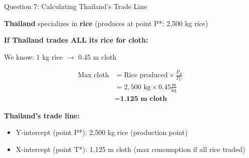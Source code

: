 \documentclass{beamer}
\begin{document}
\begin{frame}{Question 7: Calculating Thailand's Trade Line}

\textbf{Thailand} specializes in \textbf{rice} (produces at point P*: 2,500 kg rice)

\vspace{0.3cm}

\textbf{If Thailand trades ALL its rice for cloth:}

\vspace{0.2cm}

We know: 1 kg rice $\rightarrow$ 0.45 m cloth

\vspace{0.2cm}

\begin{align*}
\text{Max cloth} &= \text{Rice produced} \times \frac{P_R}{P_C} \\[0.3cm]
&= 2,500 \text{ kg} \times 0.45 \frac{\text{m}}{\text{kg}} \\[0.3cm]
&= \textbf{1,125 m cloth}
\end{align*}

\vspace{0.3cm}

\textbf{Thailand's trade line:}
\begin{itemize}
    \item Y-intercept (point P*): 2,500 kg rice (production point)
    \item X-intercept (point T*): 1,125 m cloth (max consumption if all rice traded)
\end{itemize}

\end{frame}

\end{document}
